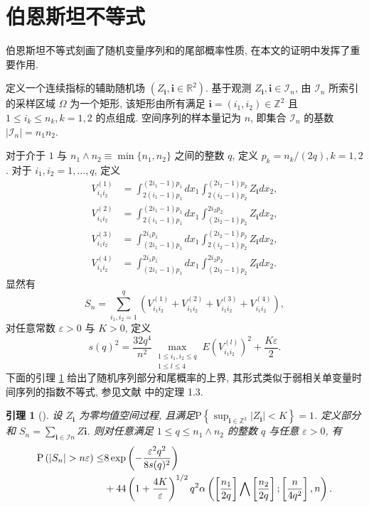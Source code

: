 \documentclass[a4paper,openay,14pt]{ctexbook}
\numberwithin{equation}{section}
\numberwithin{lem}{section}
\newtheorem{lemma}[theorem]{引理}%
\begin{document}
\section{伯恩斯坦不等式\label{Bernstein}}

伯恩斯坦不等式刻画了随机变量序列和的尾部概率性质, 在本文的证明中发挥了重要作用.

定义一个连续指标的辅助随机场 $(Z_{\mathbf{i}}, \mathbf{i}\in\mathbb{R}^2)$. 基于观测 ${Z_{\mathbf{i}}, \mathbf{i}\in\mathcal{I}_n}$, 由 $\mathcal{I}_n$ 所索引的采样区域 $\Omega$ 为一个矩形, 该矩形由所有满足 $\mathbf{i}=(i_1,i_2)\in\mathbb{Z}^2$ 且 $1\le i_k\le n_k, k=1,2$ 的点组成. 空间序列的样本量记为 $n$, 即集合 $\mathcal{I}_n$ 的基数 $|\mathcal{I}_n|=n_1 n_2$.

对于介于 $1$ 与 $n_1\wedge n_2\equiv \min\{n_1,n_2\}$ 之间的整数 $q$, 定义 $p_k=n_k/(2q), k=1,2$. 对于 $i_1,i_2=1,\ldots,q$, 定义
$$
\begin{aligned}
V_{i_1 i_2}^{(1)} & =\int_{2(i_1-1) p_1}^{(2 i_1-1) p_1} d x_1 \int_{2(i_2-1) p_2}^{(2 i_2-1) p_2} Z_\mathbf{i} d x_2, \\
V_{i_1 i_2}^{(2)} & =\int_{2(i_1-1) p_1}^{(2 i_1-1) p_1} d x_1 \int_{(2 i_2-1) p_2}^{2 i_2 p_2} Z_\mathbf{i} d x_2, \\
V_{i_1 i_2}^{(3)} & =\int_{(2 i_1-1) p_1}^{2 i_1 p_1} d x_1 \int_{2(i_2-1) p_2}^{(2 i_2-1) p_2} Z_\mathbf{i} d x_2, \\
V_{i_1 i_2}^{(4)} & =\int_{(2 i_1-1) p_1}^{2 i_1 p_1} d x_1 \int_{(2 i_2-1) p_2}^{2 i_2 p_2} Z_\mathbf{i} d x_2 .
\end{aligned}
$$
显然有
$$
S_n=\sum_{i_1, i_2=1}^q\left(V_{i_1 i_2}^{(1)}+V_{i_1 i_2}^{(2)}+V_{i_1 i_2}^{(3)}+V_{i_1 i_2}^{(4)}\right),
$$
对任意常数 $\varepsilon>0$ 与 $K>0$, 定义
$$
s(q)^2=\frac{32 q^4}{n^2} \max _{\substack{1 \leq i_1, i_2 \leq q \\ 1 \leq l \leq 4}} E\left(V_{i_1 i_2}^{(l)}\right)^2+\frac{K \varepsilon}{2}.
$$
下面的引理 \ref{Lemma:Bernstein} 给出了随机序列部分和尾概率的上界, 其形式类似于弱相关单变量时间序列的指数不等式, 参见文献\cite{bosq2012nonparametric} 中的定理 1.3.

\begin{lemma}[\cite{yao2003exponential}]\label{Lemma:Bernstein}
设 ${Z_{\mathbf{i}}}$ 为零均值空间过程, 且满足$\mathrm{P}\left\{\sup_{\mathbf{i}\in\mathbb{Z}^2}\left\vert Z_{\mathbf{i}}\right\vert<K\right\} = 1$. 定义部分和 $S_n=\sum_{\mathbf{i}\in\mathcal{I}n} Z{\mathbf{i}}$. 则对任意满足 $1\le q\le n_1\wedge n_2$ 的整数 $q$ 与任意 $\varepsilon>0$, 有
\begin{align*}
    \mathrm{P}\left(\left|S_n\right|>n \varepsilon\right) \leq
    &8\exp \left(-\frac{\varepsilon^2 q^2}{8 s(q)^2}\right)\notag\\
    &+ 44\left(1+\frac{4 K}{\varepsilon}\right)^{1 / 2} q^2 \alpha\left(\left[\frac{n_1}{2 q}\right] \bigwedge\left[\frac{n_2}{2 q}\right] ;\left[\frac{n}{4 q^2}\right], n\right).
    \end{align*}
\end{lemma}
\end{document}
